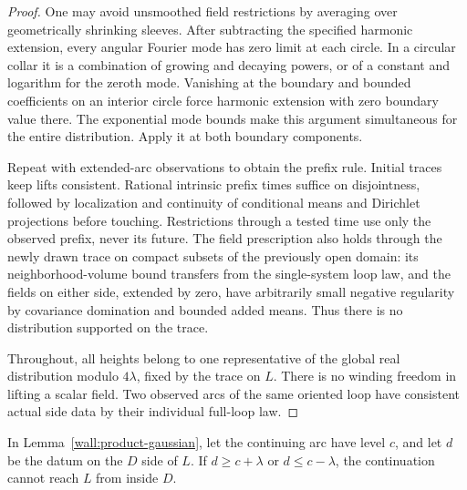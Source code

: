 \begin{proof}
One may avoid unsmoothed field restrictions by averaging over geometrically shrinking sleeves.  After subtracting the specified harmonic extension, every angular Fourier mode has zero limit at each circle.  In a circular collar it is a combination of growing and decaying powers, or of a constant and logarithm for the zeroth mode.  Vanishing at the boundary and bounded coefficients on an interior circle force harmonic extension with zero boundary value there.  The exponential mode bounds make this argument simultaneous for the entire distribution.  Apply it at both boundary components.

Repeat with extended-arc observations to obtain the prefix rule.  Initial traces keep lifts consistent.  Rational intrinsic prefix times suffice on disjointness, followed by localization and continuity of conditional means and Dirichlet projections before touching.  Restrictions through a tested time use only the observed prefix, never its future.  The field prescription also holds through the newly drawn trace on compact subsets of the previously open domain: its neighborhood-volume bound transfers from the single-system loop law, and the fields on either side, extended by zero, have arbitrarily small negative regularity by covariance domination and bounded added means.  Thus there is no distribution supported on the trace.

Throughout, all heights belong to one representative of the global real distribution modulo $4\lambda$, fixed by the trace on $L$.  There is no winding freedom in lifting a scalar field.  Two observed arcs of the same oriented loop have consistent actual side data by their individual full-loop law.
\end{proof}

\begin{lemma}\label{wall:noncontact}
In Lemma~\ref{wall:product-gaussian}, let the continuing arc have level $c$, and let $d$ be the datum on the $D$ side of $L$.  If $d\ge c+\lambda$ or $d\le c-\lambda$, the continuation cannot reach $L$ from inside $D$.
\end{lemma}


